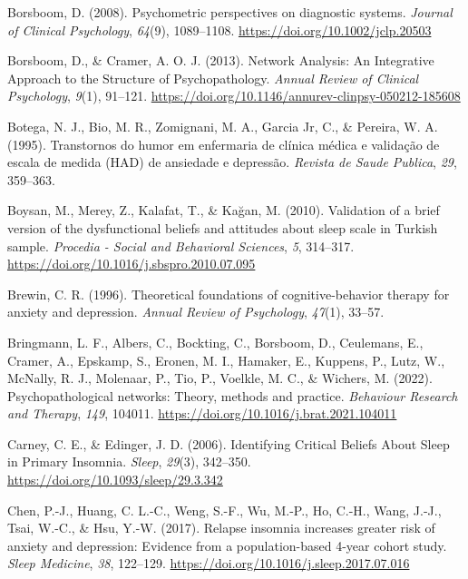 \documentclass[
  ,doc,11pt, twoside,floatsintext]{apa6}
\newlength{\cslhangindent}
\newlength{\cslentryspacingunit} %
\newenvironment{CSLReferences}[2] %
 {%
  \setlength{\parindent}{0pt}
  \ifodd #1
  \let\oldpar\par
  \def\par{\hangindent=\cslhangindent\oldpar}
  \fi
  \setlength{\parskip}{#2\cslentryspacingunit}
 }%
 {}
\begin{document}
\begin{CSLReferences}{1}{0}
\leavevmode{}%
Borsboom, D. (2008). Psychometric perspectives on diagnostic systems. \emph{Journal of Clinical Psychology}, \emph{64}(9), 1089--1108. \url{https://doi.org/10.1002/jclp.20503}

\leavevmode{}%
Borsboom, D., \& Cramer, A. O. J. (2013). Network {Analysis}: {An Integrative Approach} to the {Structure} of {Psychopathology}. \emph{Annual Review of Clinical Psychology}, \emph{9}(1), 91--121. \url{https://doi.org/10.1146/annurev-clinpsy-050212-185608}

\leavevmode{}%
Botega, N. J., Bio, M. R., Zomignani, M. A., Garcia Jr, C., \& Pereira, W. A. (1995). Transtornos do humor em enfermaria de clínica médica e validação de escala de medida (HAD) de ansiedade e depressão. \emph{Revista de Saude Publica}, \emph{29}, 359--363.

\leavevmode{}%
Boysan, M., Merey, Z., Kalafat, T., \& Kağan, M. (2010). Validation of a brief version of the dysfunctional beliefs and attitudes about sleep scale in {Turkish} sample. \emph{Procedia - Social and Behavioral Sciences}, \emph{5}, 314--317. \url{https://doi.org/10.1016/j.sbspro.2010.07.095}

\leavevmode{}%
Brewin, C. R. (1996). Theoretical foundations of cognitive-behavior therapy for anxiety and depression. \emph{Annual Review of Psychology}, \emph{47}(1), 33--57.

\leavevmode{}%
Bringmann, L. F., Albers, C., Bockting, C., Borsboom, D., Ceulemans, E., Cramer, A., Epskamp, S., Eronen, M. I., Hamaker, E., Kuppens, P., Lutz, W., McNally, R. J., Molenaar, P., Tio, P., Voelkle, M. C., \& Wichers, M. (2022). Psychopathological networks: {Theory}, methods and practice. \emph{Behaviour Research and Therapy}, \emph{149}, 104011. \url{https://doi.org/10.1016/j.brat.2021.104011}

\leavevmode{}%
Carney, C. E., \& Edinger, J. D. (2006). Identifying {Critical Beliefs About Sleep} in {Primary Insomnia}. \emph{Sleep}, \emph{29}(3), 342--350. \url{https://doi.org/10.1093/sleep/29.3.342}

\leavevmode{}%
Chen, P.-J., Huang, C. L.-C., Weng, S.-F., Wu, M.-P., Ho, C.-H., Wang, J.-J., Tsai, W.-C., \& Hsu, Y.-W. (2017). Relapse insomnia increases greater risk of anxiety and depression: Evidence from a population-based 4-year cohort study. \emph{Sleep Medicine}, \emph{38}, 122--129. \url{https://doi.org/10.1016/j.sleep.2017.07.016}


\end{CSLReferences}
\end{document}
